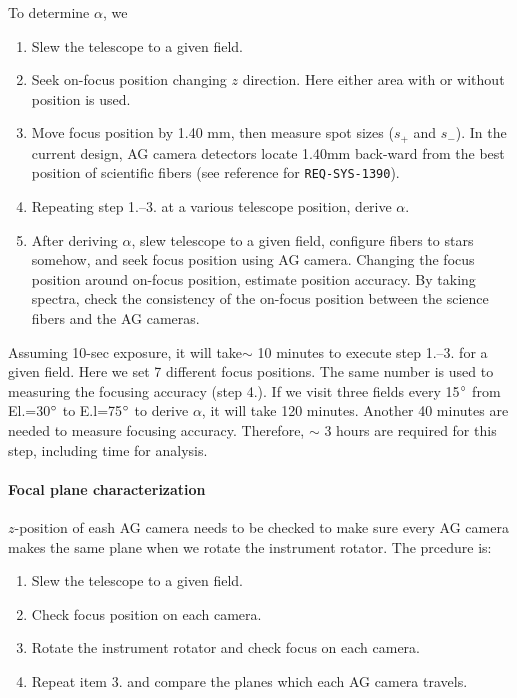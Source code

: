 To determine $\alpha$, we 
\begin{enumerate}
\item Slew the telescope to a given field.
\item Seek on-focus position changing $z$ direction. 
Here either area with or without position is used.
\item Move focus position by 1.40 mm, then measure spot sizes ($s_+$ and $s_-$).
In the current design, AG camera detectors locate 1.40mm back-ward from the best position of scientific fibers (see reference for {\tt REQ-SYS-1390}).
\item Repeating step 1.--3. at a various telescope position, derive $\alpha$.
\item After deriving $\alpha$, slew telescope to a given field, configure fibers to stars somehow, and seek focus position using AG camera.
Changing the focus position around on-focus position, estimate position accuracy.
By taking spectra, check the consistency of the on-focus position between the science fibers and the AG cameras.
\end{enumerate}

Assuming 10-sec exposure, it will take$\sim$ 10 minutes to execute step 1.--3. for a given field.
Here we set 7 different focus positions.
The same number is used to measuring the focusing accuracy (step 4.).
If we visit three fields every 15$^\circ$ from El.=30$^\circ$ to E.l=75$^\circ$ to derive $\alpha$, it will take 120 minutes.
Another 40 minutes are needed to measure focusing accuracy.
Therefore, $\sim$ 3 hours are required for this step, including time for analysis.

\paragraph{Focal plane characterization}
$z$-position of eash AG camera needs to be checked to make sure every AG camera makes the same plane when we rotate the instrument rotator.
The prcedure is:
\begin{enumerate}
\item Slew the telescope to a given field.
\item Check focus position on each camera.
\item Rotate the instrument rotator and check focus on each camera.
\item Repeat item 3. and compare the planes which each AG camera travels.
\end{enumerate}

